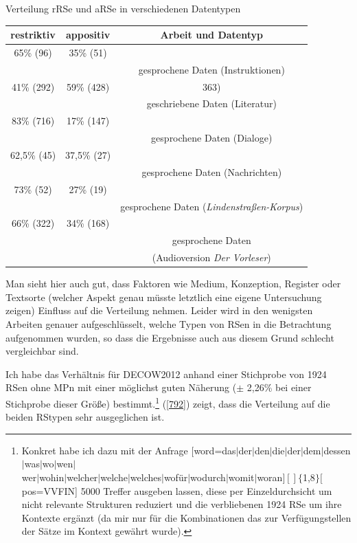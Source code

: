 \begin{exe}
	\ex\label{791} Verteilung rRSe und aRSe in verschiedenen Datentypen \\[-1em]		
 		\begin{tabular}[t]{|c|c|c|} 
 		\hline 	
   	 	\textbf{restriktiv} & \textbf{appositiv} & \textbf{Arbeit und} \textbf{Datentyp}\\ 
  		\hline\hline
  		65\% (96) & 35\% (51) & \citet[191]{Schaffranietz1997} \\ 
  		& & gesprochene Daten (Instruktionen) \\
   		\hline
   		41\% (292) & 59\% (428) & \citet[363]{Ravetto2009} 363)\\
   		& & geschriebene Daten (Literatur) \\
   		\hline
   		83\% (716) & 17\% (147) & \citet[240]{Birkner2008}\\
   		& & gesprochene Daten (Dialoge) \\
   		\hline
   		62,5\% (45) & 37,5\% (27) & \citet[172]{Grawunder2012}  \\
   		& & gesprochene Daten (Nachrichten) \\
   		\hline
   		73\% (52) & 27\% (19) & \citet[406]{Hirschberg2014}  \\
   		& & gesprochene Daten (\textit{Lindenstraßen-Korpus}) \\
   		\hline
   		66\% (322) & 34\% (168) & \citet[406-407]{Hirschberg2014}  \\
   		& & gesprochene Daten  \\
   		& & (Audioversion \textit{Der Vorleser})\\
  		\hline      
 		\end{tabular}
\end{exe}
Man sieht hier auch gut, dass Faktoren wie Medium, Konzeption, Register oder Textsorte (welcher Aspekt genau müsste letztlich eine eigene Untersuchung zeigen) Einfluss auf die Verteilung nehmen. Leider wird in den wenigsten Arbeiten genauer aufgeschlüsselt, welche Typen von RSen in die Betrachtung aufgenommen wurden, so dass die Ergebnisse auch aus diesem Grund schlecht vergleichbar sind.

Ich habe das Verhältnis für DECOW2012 anhand einer Stichprobe von 1924 RSen ohne MPn mit einer möglichst guten Näherung ($\pm$ 2,26\% bei einer Stichprobe dieser Größe) bestimmt.\footnote{Konkret habe ich dazu mit der Anfrage $[$word=\glqq  das$\vert$der$\vert$den$\vert$die$\vert$der$\vert$dem$\vert$dessen$\vert$was$\vert$wo$\vert$wen$\vert$\\wer$\vert$wohin$\vert$welcher$\vert$welche$\vert$welches$\vert$wofür$\vert$wodurch$\vert$womit$\vert$woran\grqq{}$][]\lbrace$1,8$\rbrace[$pos=\glqq VVFIN\grqq{}] 5000 Treffer ausgeben lassen, diese per Einzeldurchsicht um nicht relevante Strukturen reduziert und die verbliebenen 1924 RSe um ihre Kontexte ergänzt (da mir nur für die Kombinationen das zur Verfügungstellen der Sätze im Kontext gewährt wurde).} (\ref{792}) zeigt, dass die Verteilung auf die beiden RStypen sehr ausgeglichen ist.

